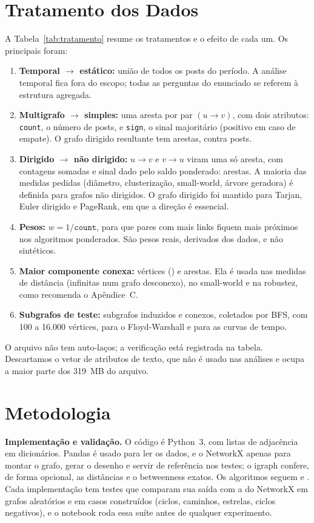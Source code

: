 \IfFileExists{webmedia.cls}{\webmediatrue\documentclass[sigconf]{webmedia}}{\documentclass[sigconf]{acmart}}
\begin{document}
\section{Tratamento dos Dados}
A Tabela~\ref{tab:tratamento} resume os tratamentos e o efeito de cada um. Os principais foram:

\begin{enumerate}
  \item \textbf{Temporal $\rightarrow$ estático:} união de todos os posts do período. A análise
    temporal fica fora do escopo; todas as perguntas do enunciado se referem à estrutura agregada.
  \item \textbf{Multigrafo $\rightarrow$ simples:} uma aresta por par $(u \rightarrow v)$, com dois
    atributos: \texttt{count}, o número de posts, e \texttt{sign}, o sinal majoritário (positivo em caso
    de empate). O grafo dirigido resultante tem \nArestasDir{} arestas, contra \postsTotal{} posts.
  \item \textbf{Dirigido $\rightarrow$ não dirigido:} $u \rightarrow v$ e $v \rightarrow u$ viram uma só
    aresta, com contagens somadas e sinal dado pelo saldo ponderado: \nArestas{} arestas. A maioria das
    medidas pedidas (diâmetro, clusterização, small-world, árvore geradora) é definida para grafos não
    dirigidos. O grafo dirigido foi mantido para Tarjan, Euler dirigido e PageRank, em que a direção é
    essencial.
  \item \textbf{Pesos:} $w = 1/\texttt{count}$, para que pares com mais links fiquem mais próximos nos
    algoritmos ponderados. São pesos reais, derivados dos dados, e não sintéticos.
  \item \textbf{Maior componente conexa:} \nLCC{} vértices (\fracLCC) e \mLCC{} arestas. Ela é usada nas
    medidas de distância (infinitas num grafo desconexo), no small-world e na robustez, como recomenda o
    Apêndice~C.
  \item \textbf{Subgrafos de teste:} subgrafos induzidos e conexos, coletados por BFS, com 100 a 16.000
    vértices, para o Floyd-Warshall e para as curvas de tempo.
\end{enumerate}
O arquivo não tem auto-laços; a verificação está registrada na tabela. Descartamos o vetor de atributos
de texto, que não é usado nas análises e ocupa a maior parte dos 319~MB do arquivo.


\section{Metodologia}
\textbf{Implementação e validação.} O código é Python~3, com listas de adjacência em dicionários.
Pandas é usado para ler os dados, e o NetworkX apenas para montar o grafo, gerar o desenho e servir de
referência nos testes; o igraph confere, de forma opcional, as distâncias e o betweenness exatos. Os
algoritmos seguem \citet{cormen2009} e \citet{tarjan1972}. Cada implementação tem testes que comparam
sua saída com a do NetworkX em grafos aleatórios e em casos construídos (ciclos, caminhos, estrelas,
ciclos negativos), e o notebook roda essa suíte antes de qualquer experimento.
\end{document}
